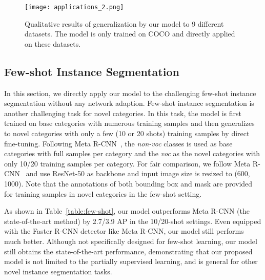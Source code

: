 \documentclass[runningheads]{llncs}
\begin{document}
\begin{figure}[!t]
	\centering
\texttt{[image: applications\_2.png]}
	\vspace{-0.2in}
	\caption{Qualitative results of generalization by our model to 9 different datasets. The model is only trained on COCO and directly applied on these datasets.}
	\label{fig:applications}
	\vspace{-0.2in}
\end{figure}

\vspace{-3mm}
\subsection{Few-shot Instance Segmentation}
\vspace{-2mm}
In this section, we directly apply our model to the challenging few-shot instance segmentation without any network adaption.
Few-shot instance segmentation is another challenging task for novel categories. In this task, the model is first trained on base categories with numerous training samples and then generalizes to novel categories with only a few (10 or 20 shots) training samples by direct fine-tuning. Following Meta R-CNN~\cite{yan2019metarcnn}, the \emph{non-voc} classes is used as base categories with full samples per category and the \emph{voc} as the novel categories with only 10/20 training samples per category. For fair comparison, we follow Meta R-CNN~\cite{yan2019metarcnn} and use ResNet-50 as backbone and input image size is resized to (600, 1000). Note that the annotations of both bounding box and mask are provided for training samples in novel categories in the few-shot setting. 

As shown in Table~\ref{table:few-shot}, our model outperforms Meta R-CNN (the state-of-the-art method) by 2.7/3.9 AP in the 10/20-shot settings. Even equipped with the Faster R-CNN detector like Meta R-CNN, our model still performs much better. Although not specifically designed for few-shot learning, our model still obtains the state-of-the-art performance, demonstrating that our proposed model is not limited to the partially supervised learning, and is general for other novel instance segmentation tasks. 
\end{document}
